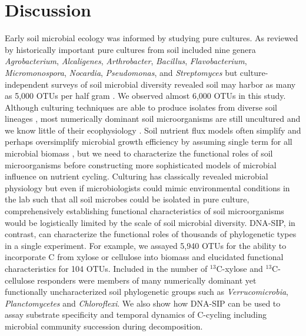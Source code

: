 \section{Discussion}
Early soil microbial ecology was informed by studying pure cultures.  As
reviewed by \citet{Janssen2006} historically important pure cultures from soil
included nine genera \textit{Agrobacterium}, \textit{Alcaligenes},
\textit{Arthrobacter}, \textit{Bacillus}, \textit{Flavobacterium},
\textit{Micromonospora}, \textit{Nocardia}, \textit{Pseudomonas}, and
\textit{Streptomyces} but culture-independent surveys of soil microbial
diversity revealed soil may harbor as many as 5,000 OTUs per half gram
\citep{Schloss2006}. We observed almost 6,000 OTUs in this study. Although
culturing techniques are able to produce isolates from diverse soil lineages
\citep{Janssen2002}, most numerically dominant soil microorganisms are still
uncultured and we know little of their ecophysiology \citep{Janssen2006}. Soil
nutrient flux models often simplify and perhaps oversimplify microbial growth
efficiency by assuming single term for all microbial biomass
\citep{Manzoni2012a} , but we need to characterize the functional roles of soil
microorganisms before constructing more sophisticated models of microbial
influence on nutrient cycling. Culturing has classically revealed microbial
physiology but even if microbiologists could mimic environmental conditions in
the lab such that all soil microbes could be isolated in pure culture,
comprehensively establishing functional characteristics of soil microorganisms
would be logistically limited by the scale of soil microbial diversity.
DNA-SIP, in contrast, can characterize the functional roles of thousands of
phylogenetic types in a single experiment. For example, we assayed 5,940 OTUs
for the ability to incorporate C from xylose or cellulose into biomass and
elucidated functional characteristics for 104 OTUs. Included in the number of
$^{13}$C-xylose and $^{13}$C-cellulose responders were members of many
numerically dominant yet functionally uncharacterized soil phylogenetic groups
such as \textit{Verrucomicrobia}, \textit{Planctomycetes} and
\textit{Chloroflexi}. We also show how DNA-SIP can be used to assay substrate
specificity and temporal dynamics of C-cycling including microbial community
succession during decomposition.

